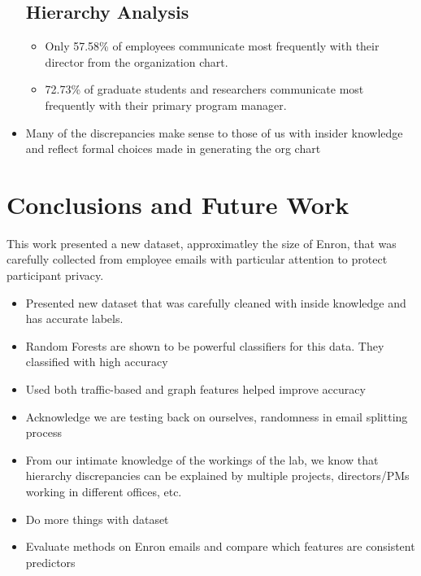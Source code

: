 \documentclass{article}
\begin{document}
\begin{itemize}
\subsection{Hierarchy Analysis}
    \begin{itemize}
    \item Only 57.58\% of employees communicate most frequently with their director from the organization chart.
    \item 72.73\% of graduate students and researchers communicate most frequently with their primary program manager.
    \end{itemize}
\item Many of the discrepancies make sense to those of us with insider knowledge and reflect formal choices made in generating the org chart

\end{itemize}



\section{Conclusions and Future Work} \label{Conclusions}
This work presented a new dataset, approximatley the size of Enron, that was carefully collected from employee emails with particular attention to protect participant privacy.

\begin{itemize}
\item Presented new dataset that was carefully cleaned with inside knowledge and has accurate labels.
\item Random Forests are shown to be powerful classifiers for this data.  They classified with high accuracy
\item Used both traffic-based and graph features helped improve accuracy
\item Acknowledge we are testing back on ourselves, randomness in email splitting process
\item From our intimate knowledge of the workings of the lab, we know that hierarchy discrepancies can be explained by multiple projects, directors/PMs working in different offices, etc.
\item Do more things with dataset
\item Evaluate methods on Enron emails and compare which features are consistent predictors
\end{itemize}


\newpage

\end{document}
